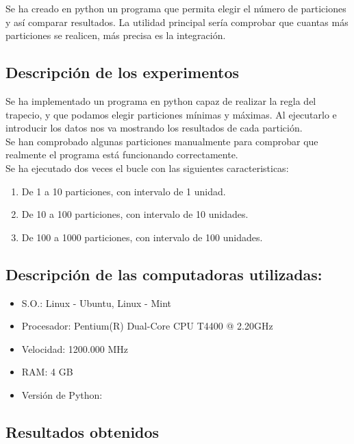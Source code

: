 \documentclass{article}
\begin{document}
   Se ha creado en python un programa que permita elegir el número de particiones y así comparar resultados. La utilidad principal sería comprobar que cuantas más particiones se realicen, más precisa es la integración.
    
    \subsection{Descripción de los experimentos}

   Se ha implementado un programa en python capaz de realizar la regla del trapecio, y que podamos elegir particiones mínimas y máximas. Al ejecutarlo e introducir los datos nos va mostrando los resultados de cada partición.\\

   Se han comprobado algunas particiones manualmente para comprobar que realmente el programa está funcionando correctamente.\\

   Se ha ejecutado dos veces el bucle con las siguientes caracteristicas:
 
   \begin{enumerate}
     \item De 1 a 10 particiones, con intervalo de 1 unidad.
     \item De 10 a 100 particiones, con intervalo de 10 unidades.
     \item De 100 a 1000 particiones, con intervalo de 100 unidades.
   \end{enumerate}

    \subsection{Descripción de las computadoras utilizadas:}

      \begin{itemize}
        \item S.O.: Linux - Ubuntu, Linux - Mint
        \item Procesador: Pentium(R) Dual-Core CPU  T4400  @ 2.20GHz
        \item Velocidad: 1200.000 MHz
        \item RAM: 4 GB
        \item Versión de Python: 
      \end{itemize}

    \subsection{Resultados obtenidos}
\end{document}
